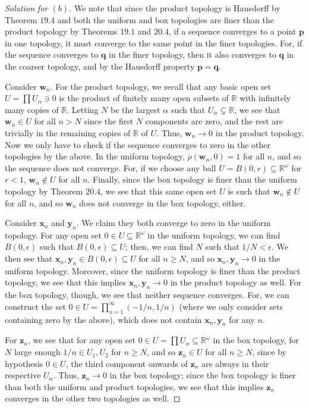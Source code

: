 \documentclass[12pt]{article}
\theoremstyle{remark}
\begin{document}
\begin{proof}[Solution for $(b)$]
  We note that since the product topology is Hausdorff by Theorem $19.4$ and
  both the uniform and box topologies are finer than the product topology by
  Theorems $19.1$ and $20.4$, if a sequence converges to a point $\mathbf{p}$ in one topology, it must converge to the same point in the finer topologies. For, if the sequence converges to $\mathbf{q}$ in the finer topology, then it also converges to $\mathbf{q}$ in the coarser topology, and by the Hausdorff property $\mathbf{p} = \mathbf{q}$.
  \par Consider $\mathbf{w}_n$. For the product topology, we recall that any
  basic open set $U = \prod U_\alpha \ni 0$ is the product of finitely many open subsets of $\mathbb{R}$ with infinitely many copies of $\mathbb{R}$. Letting $N$ be the largest $\alpha$ such that $U_\alpha \subsetneq \mathbb{R}$, we see that $\mathbf{w}_n \in U$ for all $n > N$ since the first $N$ components are zero, and the rest are trivially in the remaining copies of $\mathbb{R}$ of $U$. Thus, $\mathbf{w}_n \to 0$ in the product topology. Now we only have to check if the sequence converges to zero in the other topologies by the above. In the uniform topology, $\overline{\rho}(\mathbf{w}_n,0) = 1$ for all $n$, and so the sequence does not converge. For, if we choose any ball $U = B(0,r) \subseteq \mathbb{R}^\omega$ for $r < 1$, $\mathbf{w}_n \notin U$ for all $n$. Finally, since the box topology is finer than the uniform topology by Theorem $20.4$, we see that this same open set $U$ is such that $\mathbf{w}_n \notin U$ for all $n$, and so $\mathbf{w}_n$ does not converge in the box topology, either.
  \par Consider $\mathbf{x}_n$ and $\mathbf{y}_n$. We claim they both converge to zero in the uniform topology. For any open set $0 \in U \subseteq \mathbb{R}^\omega$ in the uniform topology, we can find $B(0,\epsilon)$ such that $B(0,\epsilon) \subseteq U$; then, we can find $N$ such that $1/N < \epsilon$. We then see that $\mathbf{x}_n,\mathbf{y}_n \in B(0,\epsilon) \subseteq U$ for all $n \ge N$, and so $\mathbf{x}_n,\mathbf{y}_n \to 0$ in the uniform topology. Moreover, since the uniform topology is finer than the product topology, we see that this implies $\mathbf{x}_n,\mathbf{y}_n \to 0$ in the product topology as well. For the box topology, though, we see that neither sequence converges. For, we can construct the set $0 \in U = \prod_{n=1}^\infty (-1/n,1/n)$ (where we only consider sets containing zero by the above), which does not contain $\mathbf{x}_n,\mathbf{y}_n$ for any $n$.
  \par For $\mathbf{z}_n$, we see that for any open set $0 \in U = \prod U_\alpha \subseteq \mathbb{R}^\omega$ in the box topology, for $N$ large enough $1/n \in U_1,U_2$ for $n \ge N$, and so $\mathbf{z}_n \in U$ for all $n \ge N$, since by hypothesis $0 \in U$, the third component onwards of $\mathbf{z}_n$ are always in their respective $U_\alpha$. Thus, $\mathbf{z}_n \to 0$ in the box topology; since the box topology is finer than both the uniform and product topologies, we see that this implies $\mathbf{z}_n$ converges in the other two topologies as well.
\end{proof}
\end{document}
